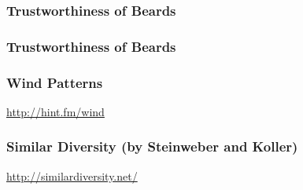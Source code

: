 \documentclass[12pt]{beamer}\usepackage[]{graphicx}\usepackage[]{color}
\begin{document}

\begin{frame}
\frametitle{Trustworthiness of Beards}
\begin{center}
\end{center}
\end{frame}


\begin{frame}
\frametitle{Trustworthiness of Beards}
\begin{center}
\end{center}
\end{frame}


\begin{frame}
\begin{center}
\Huge{}
\end{center}
\end{frame}


\begin{frame}
\frametitle{Wind Patterns}
\begin{center}

{\scriptsize \url{http://hint.fm/wind}}
\end{center}
\end{frame}


\begin{frame}
\frametitle{Similar Diversity (by Steinweber and Koller)}
\begin{center}

{\scriptsize \url{http://similardiversity.net/}}
\end{center}
\end{frame}


\begin{frame}
\frametitle{}
\begin{center}
\end{center}
\end{frame}
\end{document}
